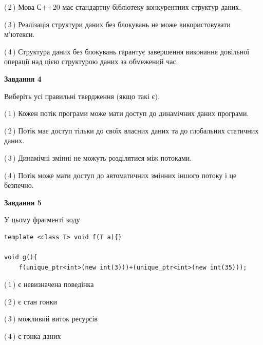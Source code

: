 \documentclass[12pt, ukrainian]{article}
\begin{document}
\begin {large}
{(\,2\,) Мова С++20 має стандартну бібліотеку конкурентних структур даних.%

(\,3\,) Реалізація структури даних без блокувань не може використовувати м’ютекси.%

(\,4\,) Структура даних без блокувань гарантує завершення виконання довільної операції над цією структурою даних за обмежений час.%



\begin{center}
\textbf{Завдання 4}
\end{center}
Виберіть усі правильні твердження (якщо такі є).\par
\vspace{2mm}

(\,1\,) Кожен потік програми може мати доступ до динамічних даних програми.%

(\,2\,) Потік має доступ тільки до своїх власних даних та до глобальних статичних даних.%

(\,3\,) Динамічні змінні не можуть розділятися між потоками.%

(\,4\,) Потік може мати доступ до автоматичних змінних іншого потоку і це безпечно.%



\begin{center}
\textbf{Завдання 5}
\end{center}
У цьому фрагменті коду
\begin{verbatim}
template <class T> void f(T a){}

void g(){
    f(unique_ptr<int>(new int(3)))+(unique_ptr<int>(new int(35)));
\end{verbatim}

(\,1\,) є невизначена поведінка%

(\,2\,) є стан гонки%

(\,3\,) можливий виток ресурсів%

(\,4\,) є гонка даних%


}
\end {large}
\end{document}
